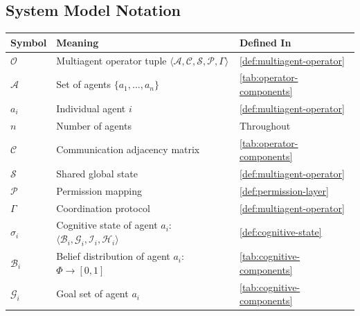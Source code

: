 \documentclass[
]{article}
\newcounter{none} %
\begin{document}
\subsection{System Model Notation}\label{system-model-notation}

{\def\LTcaptype{none} %
\begin{longtable}[]{@{}
  >{\raggedright\arraybackslash}p{}
  >{\raggedright\arraybackslash}p{}
  >{\raggedright\arraybackslash}p{}@{}}
\toprule\noalign{}
\begin{minipage}[b]{\linewidth}\raggedright
Symbol
\end{minipage} & \begin{minipage}[b]{\linewidth}\raggedright
Meaning
\end{minipage} & \begin{minipage}[b]{\linewidth}\raggedright
Defined In
\end{minipage} \\
\midrule\noalign{}
\endhead
\bottomrule\noalign{}
\endlastfoot
\(\mathcal{O}\) & Multiagent operator tuple
\(\langle \mathcal{A}, \mathcal{C}, \mathcal{S}, \mathcal{P}, \Gamma \rangle\)
& \cref{def:multiagent-operator} \\
\(\mathcal{A}\) & Set of agents \(\{a_1, \ldots, a_n\}\) &
\cref{tab:operator-components} \\
\(a_i\) & Individual agent \(i\) & \cref{def:multiagent-operator} \\
\(n\) & Number of agents & Throughout \\
\(\mathcal{C}\) & Communication adjacency matrix &
\cref{tab:operator-components} \\
\(\mathcal{S}\) & Shared global state &
\cref{def:multiagent-operator} \\
\(\mathcal{P}\) & Permission mapping & \cref{def:permission-layer} \\
\(\Gamma\) & Coordination protocol & \cref{def:multiagent-operator} \\
\(\sigma_i\) & Cognitive state of agent \(a_i\):
\(\langle \mathcal{B}_i, \mathcal{G}_i, \mathcal{I}_i, \mathcal{H}_i \rangle\)
& \cref{def:cognitive-state} \\
\(\mathcal{B}_i\) & Belief distribution of agent \(a_i\):
\(\Phi \to [0,1]\) & \cref{tab:cognitive-components} \\
\(\mathcal{G}_i\) & Goal set of agent \(a_i\) &
\cref{tab:cognitive-components} \\

\end{longtable}}
\end{document}

